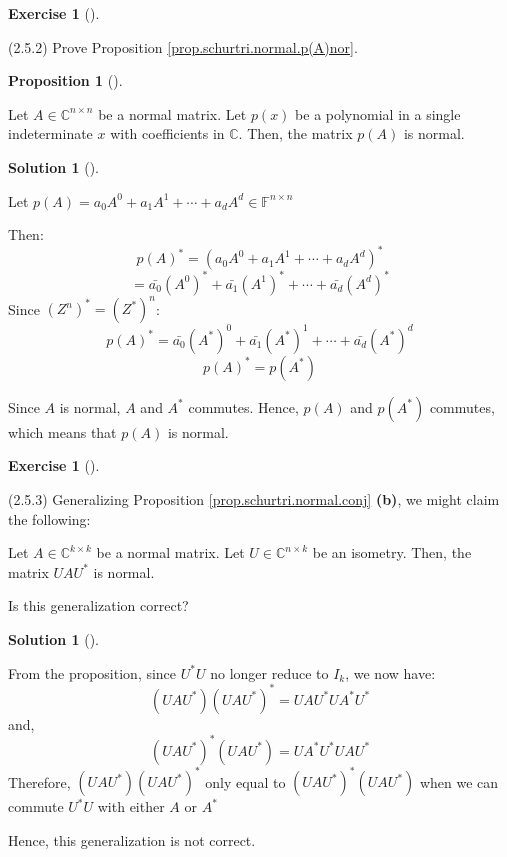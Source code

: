 \documentclass[numbers=enddot,12pt,final,onecolumn,notitlepage]{scrartcl}
\newcounter{exer}
\newcounter{sol}
\theoremstyle{definition}
\newtheorem{prop}[theo]{Proposition}
\newenvironment{proposition}[1][]
{\begin{prop}[#1]\begin{leftbar}}
        {\end{leftbar}\end{prop}}
\newtheorem{exmp}[exer]{Exercise}
\newenvironment{exercise}[1][]
{\begin{exmp}[#1]\begin{leftbar}}
        {\end{leftbar}\end{exmp}}
\newtheorem{solu}[sol]{Solution}
\newenvironment{solution}[1][]
{\begin{solu}[#1]\begin{leftbar}}
        {\end{leftbar}\end{solu}}
\begin{document}
\begin{exercise}
	\label{exe.schurtri.normal.p(A)nor} (2.5.2) Prove Proposition
	\ref{prop.schurtri.normal.p(A)nor}.

	\begin{proposition}
		\label{prop.schurtri.normal.p(A)nor}Let $A\in\mathbb{C}^{n\times n}$ be a
		normal matrix. Let $p\left(  x\right)  $ be a polynomial in a single
		indeterminate $x$ with coefficients in $\mathbb{C}$. Then, the matrix
		$p\left(  A\right)  $ is normal.
	\end{proposition}
\end{exercise}

\begin{solution}
	Let $p\left(  A\right) = a_{0}A^{0}+a_{1}A^{1}+\cdots+a_{d}A^{d}\in\mathbb{F}^{n\times n}$

	Then:
	\[
		p(A)^{\ast} = (a_{0}A^{0}+a_{1}A^{1}+\cdots+a_{d}A^{d})^{\ast}
	\]
	\[
		= \bar{a_{0}}(A^{0})^{\ast}+\bar{a_{1}}(A^{1})^{\ast}+\cdots+\bar{a_{d}}(A^{d})^{\ast}
	\]
	Since $(Z^n)^{\ast} = (Z^{\ast})^n$:
	\[
		p(A)^{\ast} = \bar{a_{0}}(A^{\ast})^0+\bar{a_{1}}(A^{\ast})^{1}+\cdots+\bar{a_{d}}(A^{\ast})^{d}
	\]
	\[
		p(A)^{\ast} = p(A^{\ast})
	\]

	Since $A$ is normal, $A$ and $A^{\ast}$ commutes. Hence, $p(A)$ and $p(A^{\ast})$ commutes, which means that $p(A)$ is normal.
\end{solution}

\begin{exercise}
	\label{exe.schurtri.normal.isometry} (2.5.3) Generalizing Proposition
	\ref{prop.schurtri.normal.conj} \textbf{(b)}, we might claim the following:

	Let $A\in\mathbb{C}^{k\times k}$ be a normal matrix. Let $U\in\mathbb{C}%
		^{n\times k}$ be an isometry. Then, the matrix $UAU^{\ast}$ is normal.

	Is this generalization correct?
\end{exercise}

\begin{solution}
	From the proposition, since $U^{\ast}U$ no longer reduce to $I_k$, we now have:
	\[
		(UAU^{\ast})(UAU^{\ast})^{\ast} = UAU^{\ast}UA^{\ast}U^{\ast}
	\]
	and,
	\[
		(UAU^{\ast})^{\ast}(UAU^{\ast}) = UA^{\ast}U^{\ast}UAU^{\ast}
	\]
	Therefore, $(UAU^{\ast})(UAU^{\ast})^{\ast}$ only equal to $(UAU^{\ast})^{\ast}(UAU^{\ast})$ when we can commute $U^{\ast}U$ with either $A$ or $A^{\ast}$

	Hence, this generalization is not correct.
\end{solution}
\end{document}
